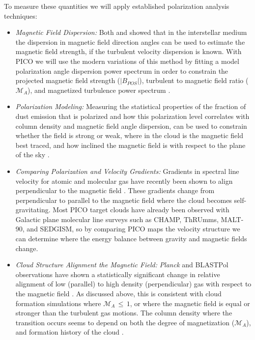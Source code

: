 \documentclass[PICOReport.tex]{subfiles}
\begin{document}
To measure these quantities we will apply established polarization analysis techniques:
\begin{itemize}
\item {\em Magnetic Field Dispersion:} Both \cite{Davis1951} and \cite{Chandrasekhar1953} showed that in the interstellar medium the dispersion in magnetic field direction angles can be used to estimate the magnetic field strength, if the turbulent velocity dispersion is known.  With PICO we will use the modern variations of this method \citep{Hildebrand2009,Houde2009,Houde2011} by fitting a model polarization angle dispersion power spectrum in order to constrain the projected magnetic field strength ($|B_{POS}|$), turbulent to magnetic field ratio ($\mathcal{M}_A$), and magnetized turbulence power spectrum .
\item {\em Polarization Modeling:} Measuring the statistical properties of the fraction of dust emission that is polarized and how this polarization level correlates with column density and magnetic field angle dispersion, can be used to constrain whether the field is strong or weak, where in the cloud is the magnetic field best traced, and how inclined the magnetic field is with respect to the plane of the sky \citep{Fissel2016, King2018}. 
\item {\em Comparing Polarization and Velocity Gradients:} Gradients in spectral line velocity for atomic and molecular gas have recently been shown to align perpendicular to the magnetic field \citep{GonzalezCasanova2017,Yuen2017, Lazarian2018}.  These gradients change from perpendicular to parallel to the magnetic field where the cloud becomes self-gravitating.  Most PICO target clouds have already been observed with Galactic plane molecular line surveys such as CHAMP, ThRUmms, MALT-90, and SEDGISM, so by comparing PICO maps the velocity structure we can determine where the energy balance between gravity and magnetic fields change.
\item {\em Cloud Structure Alignment the Magnetic Field:} {\em Planck} and BLASTPol observations have shown a statistically significant change in relative alignment of low (parallel) to high density (perpendicular) gas with respect to the magnetic field \citep{Planck:XXXV, Soler2017, Fissel2018}. As discussed above, this is consistent with cloud formation simulations where $\mathcal{M}_A\,\leq\,1$, or where the magnetic field is equal or stronger than the turbulent gas motions. The column density where the transition occurs seems to depend on both the degree of magnetization ($\mathcal{M}_A$), and formation history of the cloud \citep{Soler2017,Soler2017b}.
\end{itemize}
\end{document}
